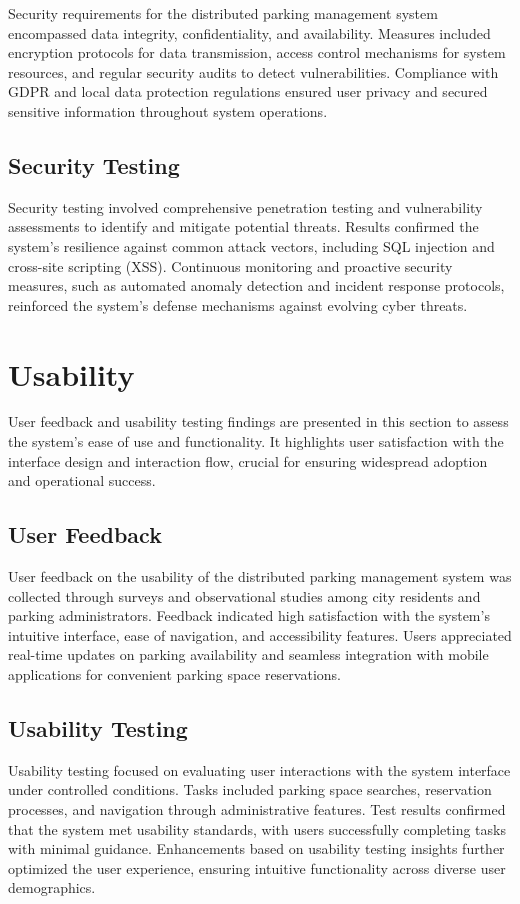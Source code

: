 \documentclass[oneside, 12pt, a4paper]{book}
\begin{document}
Security requirements for the distributed parking management system encompassed data integrity, confidentiality, and availability. Measures included encryption protocols for data transmission, access control mechanisms for system resources, and regular security audits to detect vulnerabilities. Compliance with GDPR and local data protection regulations ensured user privacy and secured sensitive information throughout system operations.
\section{Security Testing}

Security testing involved comprehensive penetration testing and vulnerability assessments to identify and mitigate potential threats. Results confirmed the system's resilience against common attack vectors, including SQL injection and cross-site scripting (XSS). Continuous monitoring and proactive security measures, such as automated anomaly detection and incident response protocols, reinforced the system's defense mechanisms against evolving cyber threats.
\chapter{Usability}
User feedback and usability testing findings are presented in this section to assess the system's ease of use and functionality. It highlights user satisfaction with the interface design and interaction flow, crucial for ensuring widespread adoption and operational success.
\section{User Feedback}

User feedback on the usability of the distributed parking management system was collected through surveys and observational studies among city residents and parking administrators. Feedback indicated high satisfaction with the system's intuitive interface, ease of navigation, and accessibility features. Users appreciated real-time updates on parking availability and seamless integration with mobile applications for convenient parking space reservations.
\section{Usability Testing}

Usability testing focused on evaluating user interactions with the system interface under controlled conditions. Tasks included parking space searches, reservation processes, and navigation through administrative features. Test results confirmed that the system met usability standards, with users successfully completing tasks with minimal guidance. Enhancements based on usability testing insights further optimized the user experience, ensuring intuitive functionality across diverse user demographics.
\end{document}
